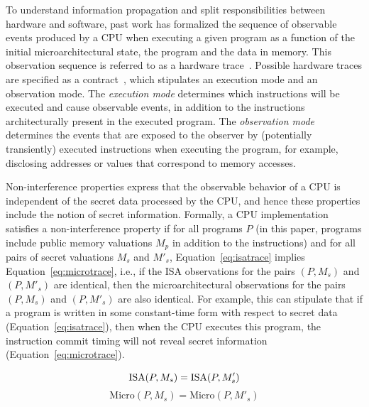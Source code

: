 To understand information propagation and split responsibilities between hardware and software, past work has formalized the sequence of observable events produced by a CPU when executing a given program as a function of the initial microarchitectural state, the program and the data in memory.
This observation sequence is referred to as a hardware trace~\cite{oleksenko2022revizor}.
Possible hardware traces are specified as a contract~\cite{guarnieri2021hardware}, which stipulates an execution mode and an observation mode.
The \emph{execution mode} determines which instructions will be executed and cause observable events, in addition to the instructions architecturally present in the executed program.
The \emph{observation mode} determines the events that are exposed to the observer by (potentially transiently) executed instructions when executing the program, for example, disclosing addresses or values that correspond to memory accesses.

Non-interference properties express that the observable behavior of a CPU is independent of the secret data processed by the CPU, and hence these properties include the notion of secret information. 
Formally, a CPU implementation satisfies a non-interference property if for all programs $P$ (in this paper, programs include public memory valuations $M_p$ in addition to the instructions) and for all pairs of secret valuations $M_s$ and $M'_s$, Equation~\ref{eq:isatrace} implies Equation~\ref{eq:microtrace}, i.e., if the ISA observations for the pairs $(P, M_s)$ and $(P, M'_s)$ are identical, then the microarchitectural observations for the pairs $(P, M_s)$ and $(P, M'_s)$ are also identical.
For example, this can stipulate that if a program is written in some constant-time form with respect to secret data (Equation~\ref{eq:isatrace}), then when the CPU executes this program, the instruction commit timing will not reveal secret information (Equation~\ref{eq:microtrace}).


\begin{equation}
\vspace*{-.3em}
\label{eq:isatrace}
\text{ISA}(P, M_s) = \text{ISA}(P, M'_s)
\end{equation}
\begin{equation}
\label{eq:microtrace}
\text{Micro}(P, M_s) = \text{Micro}(P, M'_s)
\end{equation}


